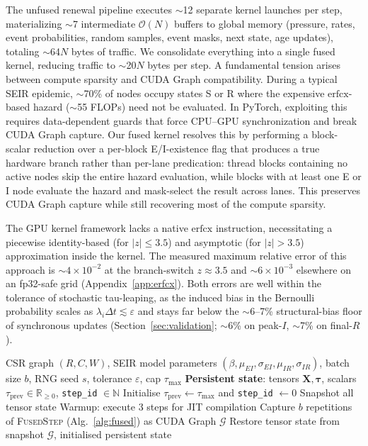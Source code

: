 \documentclass[a4paper,fleqn]{cas-sc}
\theoremstyle{definition}
\theoremstyle{remark}
\newcommand{\bigO}{\mathcal{O}}
\begin{document}
The unfused renewal pipeline executes $\sim$12 separate kernel launches per step, materializing $\sim$7 intermediate $\bigO(N)$ buffers to global memory (pressure, rates, event probabilities, random samples, event masks, next state, age updates), totaling $\sim$64$N$ bytes of traffic. We consolidate everything into a single fused kernel, reducing traffic to $\sim$20$N$ bytes per step.
A fundamental tension arises between compute sparsity and CUDA Graph compatibility. During a typical SEIR epidemic, $\sim$70\% of nodes occupy states S or R where the expensive $\mathrm{erfcx}$-based hazard ($\sim$55 FLOPs) need not be evaluated. In PyTorch, exploiting this requires data-dependent guards that force CPU--GPU synchronization and break CUDA Graph capture. Our fused kernel resolves this by performing a block-scalar reduction over a per-block E/I-existence flag that produces a true hardware branch rather than per-lane predication: thread blocks containing no active nodes skip the entire hazard evaluation, while blocks with at least one E or I node evaluate the hazard and mask-select the result across lanes. This preserves CUDA Graph capture while still recovering most of the compute sparsity. 

The GPU kernel framework lacks a native $\mathrm{erfcx}$ instruction, necessitating a piecewise identity-based (for $|z| \leq 3.5$) and asymptotic (for $|z| > 3.5$) approximation inside the kernel. The measured maximum relative error of this approach is $\sim$$4 \times 10^{-2}$ at the branch-switch $z \approx 3.5$ and $\sim$$6 \times 10^{-3}$ elsewhere on an fp32-safe grid (Appendix~\ref{app:erfcx}). Both errors are well within the tolerance of stochastic tau-leaping, as the induced bias in the Bernoulli probability scales as $\lambda_i \Delta t \lesssim \varepsilon$ and stays far below the $\sim$6--7\% structural-bias floor of synchronous updates (Section~\ref{sec:validation}; $\sim$6\% on peak-$I$, $\sim$7\% on final-$R$).

\begin{algorithm}[!h]
\caption{Fused Renewal Engine with CUDA Graph: Capture}
\label{alg:fused_capture}
\begin{algorithmic}[1]
\Require CSR graph $(R, C, W)$, SEIR model parameters $(\beta, \mu_{EI}, \sigma_{EI}, \mu_{IR}, \sigma_{IR})$, batch size $b$, RNG seed $s$, tolerance $\varepsilon$, cap $\tau_{\max}$
\State \textbf{Persistent state}: tensors $\mathbf{X}, \bm{\tau}$, scalars $\tau_{\mathrm{prev}} \in \mathbb{R}_{\geq 0}$, \texttt{step\_id} $\in \mathbb{N}$
\State Initialise $\tau_{\mathrm{prev}} \gets \tau_{\max}$ and \texttt{step\_id} $\gets 0$
\State Snapshot all tensor state
\State Warmup: execute 3 steps for JIT compilation
\State Capture $b$ repetitions of \textsc{FusedStep} (Alg.~\ref{alg:fused}) as CUDA Graph $\mathcal{G}$
\State Restore tensor state from snapshot
\State \Return $\mathcal{G}$, initialised persistent state
\end{algorithmic}
\end{algorithm}
\end{document}
